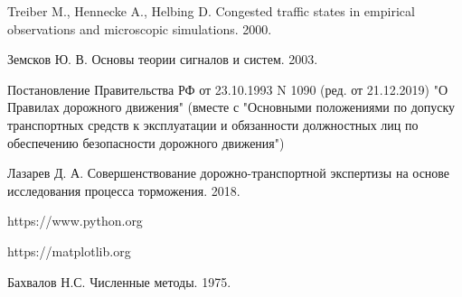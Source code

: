 \documentclass[12pt, a4paper]{extarticle}
\numberwithin{equation}{section}
\numberwithin{figure}{section}
\begin{document}
\begin{thebibliography}{**}
	Treiber M., Hennecke A., Helbing D. Congested traffic states in empirical observations and
	microscopic simulations. 2000.
	
	Земсков Ю. В. Основы теории сигналов и систем. 2003.
	
	Постановление Правительства РФ от 23.10.1993 N 1090 (ред. от 21.12.2019) "О Правилах дорожного движения" (вместе с "Основными положениями по допуску транспортных средств к эксплуатации и обязанности должностных лиц по обеспечению безопасности дорожного движения")

	Лазарев Д. А. Совершенствование дорожно-транспортной экспертизы на основе исследования процесса торможения. 2018.

	https://www.python.org
	
	https://matplotlib.org
	
	Бахвалов Н.С.  Численные методы. 1975. 

\end{thebibliography}

\newpage
\end{document}
